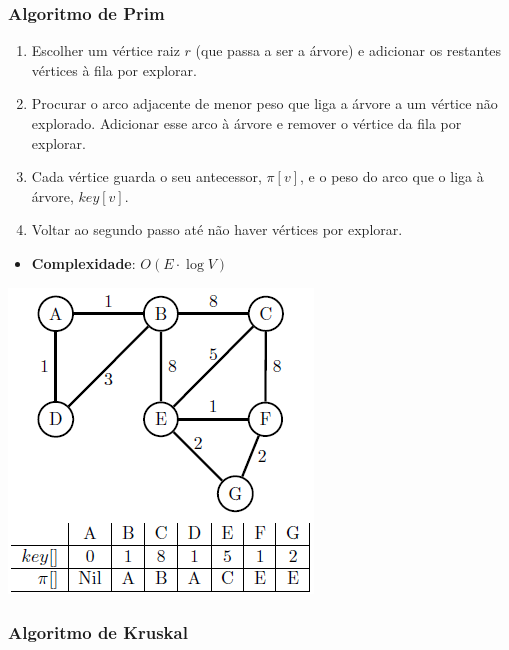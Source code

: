 \documentclass[11pt]{article}
\begin{document}
\subsubsection{Algoritmo de Prim}

\begin{minipage}{0.65\textwidth}
    \begin{enumerate}
        \item Escolher um vértice raiz $r$ (que passa a ser a árvore) e adicionar os restantes vértices à fila por explorar.
        \item Procurar o arco adjacente de menor peso que liga a árvore a um vértice não explorado. Adicionar esse arco à árvore e remover o vértice da fila por explorar.
        \item Cada vértice guarda o seu antecessor, $\pi[v]$, e o peso do arco que o liga à árvore, $key[v]$.
        \item Voltar ao segundo passo até não haver vértices por explorar.
    \end{enumerate}
    \begin{itemize}
        \item \textbf{Complexidade}: $O(E \cdot \log V)$
    \end{itemize}
\end{minipage}
\begin{minipage}{0.34\textwidth}
    \includegraphics[scale=0.7, right]{prim.png}
\end{minipage}

\subsubsection{Algoritmo de Kruskal}
\end{document}
